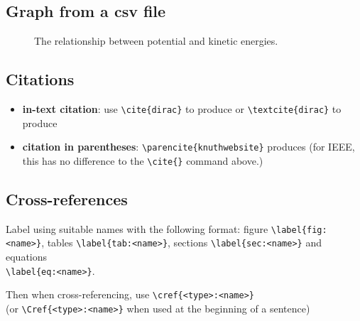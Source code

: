 \documentclass[../main.tex]{subfiles}
\begin{document}
\subsection{Graph from a csv file}
\begin{figure}[H] 
    \begin{center}
        
        \caption{The relationship between potential and
        kinetic energies.} \label{fig:pot-kin-energies}
    \end{center}
\end{figure}

\subsection{Citations}

\begin{itemize} 
    \item \textbf{in-text citation}: use
        \verb|\cite{dirac}| to produce \cite{dirac} or
        \verb|\textcite{dirac}| to produce \textcite{dirac}
    \item \textbf{citation in parentheses}:
        \verb|\parencite{knuthwebsite}| produces 
        \parencite{knuthwebsite} (for IEEE, this has no 
        difference to the \verb|\cite{}| command
        above.)
\end{itemize}

\subsection{Cross-references}

Label using suitable names with the following format: figure 
\verb|\label{fig:<name>}|, tables \verb|\label{tab:<name>}|,
sections \verb|\label{sec:<name>}| and equations\\ 
\verb|\label{eq:<name>}|.

Then when cross-referencing, use
\verb|\cref{<type>:<name>}|\\
(or \verb|\Cref{<type>:<name>}| when used at the beginning 
of a sentence)
\end{document}
